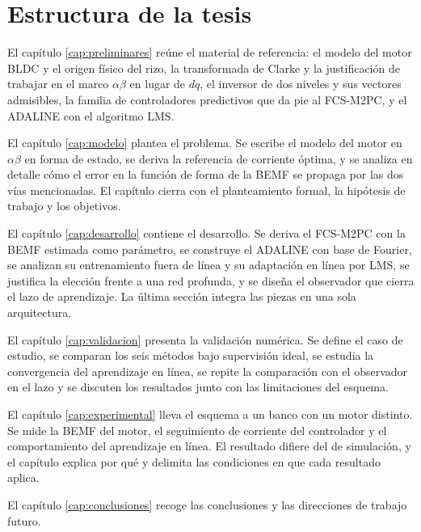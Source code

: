 \documentclass[../../../Tesis_JALS_Maestria.tex]{subfiles}
\begin{document}
\section{Estructura de la tesis}
\label{sec:estructura}

El capítulo \ref{cap:preliminares} reúne el material de referencia: el modelo del motor BLDC y el origen físico del rizo, la transformada de Clarke y la justificación de trabajar en el marco $\alpha\beta$ en lugar de $dq$, el inversor de dos niveles y sus vectores admisibles, la familia de controladores predictivos que da pie al FCS-M2PC, y el ADALINE con el algoritmo LMS.

El capítulo \ref{cap:modelo} plantea el problema. Se escribe el modelo del motor en $\alpha\beta$ en forma de estado, se deriva la referencia de corriente óptima, y se analiza en detalle cómo el error en la función de forma de la BEMF se propaga por las dos vías mencionadas. El capítulo cierra con el planteamiento formal, la hipótesis de trabajo y los objetivos.

El capítulo \ref{cap:desarrollo} contiene el desarrollo. Se deriva el FCS-M2PC con la BEMF estimada como parámetro, se construye el ADALINE con base de Fourier, se analizan su entrenamiento fuera de línea y su adaptación en línea por LMS, se justifica la elección frente a una red profunda, y se diseña el observador que cierra el lazo de aprendizaje. La última sección integra las piezas en una sola arquitectura.

El capítulo \ref{cap:validacion} presenta la validación numérica. Se define el caso de estudio, se comparan los seis métodos bajo supervisión ideal, se estudia la convergencia del aprendizaje en línea, se repite la comparación con el observador en el lazo y se discuten los resultados junto con las limitaciones del esquema.

El capítulo \ref{cap:experimental} lleva el esquema a un banco con un motor distinto. Se mide la BEMF del motor, el seguimiento de corriente del controlador y el comportamiento del aprendizaje en línea. El resultado difiere del de simulación, y el capítulo explica por qué y delimita las condiciones en que cada resultado aplica.

El capítulo \ref{cap:conclusiones} recoge las conclusiones y las direcciones de trabajo futuro.
\end{document}
